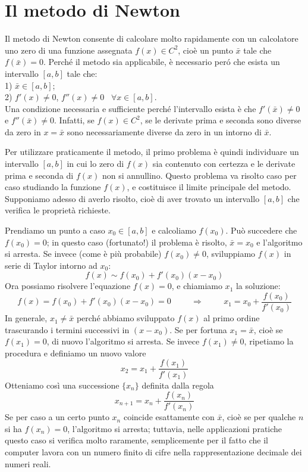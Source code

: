 \documentclass[pre,aps,12pt]{revtex4}
\newcommand{\beq}{\begin{equation}}
\newcommand{\eeq}{\end{equation}}
\newcommand{\spazio}{\vspace{.5cm}}
\begin{document}
\section{Il metodo di Newton}

\noindent
Il metodo di Newton consente di calcolare molto rapidamente con un calcolatore
uno zero di una funzione assegnata $f(x) \in C^2$, cio\`e un punto $\bar{x}$ tale
che $f(\bar{x})=0$.
Perch\'e il metodo sia applicabile,
\`e necessario per\'o che esista un intervallo $[a,b]$
tale che: \\
1) $\bar{x} \in [a,b]$; \\
2) $f'(x) \neq 0$, $f''(x) \neq 0$ \ $\forall x \in [a,b]$. \\
Una condizione necessaria e sufficiente perch\'e l'intervallo esista \`e che
$f'(\bar{x}) \neq 0$ e $f''(\bar{x}) \neq 0$. Infatti, se $f(x) \in C^2$,
se le derivate prima e seconda sono diverse da zero in $x=\bar{x}$ sono
necessariamente diverse da zero in un intorno di $\bar{x}$.

\spazio

Per utilizzare praticamente il metodo, il primo problema \`e quindi individuare
un intervallo $[a,b]$ in cui lo zero di $f(x)$ sia contenuto con certezza e 
le derivate prima e seconda di $f(x)$ non si annullino. Questo problema va
risolto caso per caso studiando la funzione $f(x)$, e costituisce il limite
principale del metodo. Supponiamo adesso di averlo risolto, cio\`e di aver
trovato un intervallo $[a,b]$ che verifica le propriet\`a richieste.

\spazio

Prendiamo un punto a caso $x_0 \in [a,b]$ e calcoliamo $f(x_0)$. Pu\`o
succedere che $f(x_0)=0$; in questo caso (fortunato!) il problema \`e risolto,
$\bar{x}=x_0$ e l'algoritmo si arresta. Se invece (come \`e pi\`u probabile)
$f(x_0) \neq 0$, sviluppiamo $f(x)$ in serie di Taylor intorno ad $x_0$:
\beq
\nonumber
f(x) \sim f(x_0) + f'(x_0) (x-x_0)
\eeq
Ora possiamo risolvere l'equazione $f(x)=0$, e chiamiamo $x_1$ la soluzione:
\beq
\nonumber
f(x)=f(x_0) + f'(x_0) (x-x_0)= 0 \hspace{1cm} \Rightarrow\hspace{1cm}
x_1=x_0 + \frac{f(x_0)}{f'(x_0)}
\eeq
In generale, $x_1 \neq \bar{x}$ perch\'e abbiamo sviluppato $f(x)$
al primo ordine trascurando i termini successivi in $(x-x_0)$. 
Se per fortuna $x_1 = \bar{x}$, cio\`e se $f(x_1)=0$, di nuovo l'algoritmo
si arresta. Se invece $f(x_1) \neq 0$, ripetiamo la procedura e definiamo un nuovo valore
\beq
\nonumber
x_2=x_1 + \frac{f(x_1)}{f'(x_1)}
\eeq
Otteniamo cos\`i una successione $\{ x_n \}$ definita dalla regola
\beq
\label{regola}
x_{n+1}=x_n + \frac{f(x_n)}{f'(x_n)}
\eeq
Se per caso a un certo punto $x_n$ coincide esattamente con $\bar{x}$, cio\`e
se per qualche $n$ si ha $f(x_n)=0$, l'algoritmo si arresta; tuttavia, nelle
applicazioni pratiche questo caso si verifica molto raramente,
semplicemente per il fatto che il computer lavora con un numero finito
di cifre nella rappresentazione decimale dei numeri reali.
\end{document}
